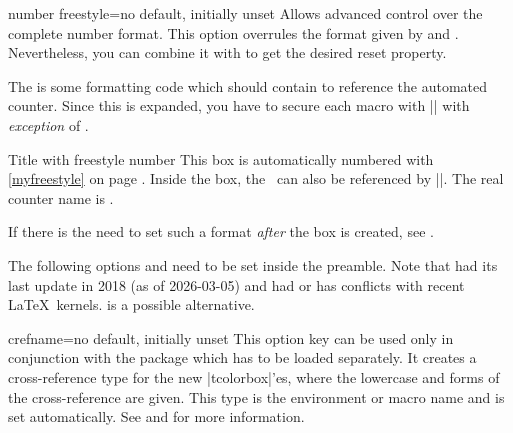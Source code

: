 \begin{newTcbKey}{number freestyle}{=}{no default, initially unset}
Allows advanced control over the complete number format. This option overrules
the format given by  and .
Nevertheless, you can combine it with  to
get the desired reset property.\par
The  is some formatting code which should contain  to
reference the automated counter. Since this  is expanded, you have
to secure each macro with |\noexpand| with \emph{exception} of .


\begin{dispExample}
\begin{phbox}[label={myfreestyle}]{Title with freestyle number}
This box is automatically numbered with \ref{myfreestyle} on page
\pageref{myfreestyle}. Inside the box, the \thetcbcounter\ can
also be referenced by |\thetcbcounter|.
The real counter name is \texttt{\tcbcounter}.
\end{phbox}
\end{dispExample}

If there is the need to set such a format \emph{after} the box is created,
see .
\end{newTcbKey}

\clearpage
\begin{marker}
The following options  and 
need to be set inside the preamble.
Note that  had its last update in 2018 (as of 2026-03-05) and
had or has conflicts with recent \LaTeX\ kernels.  is
a possible alternative.
\end{marker}

\begin{newTcbKey}[][doc updated=2014-12-01]{crefname}{=}{no default, initially unset}
  This option key can be used only in conjunction with the  package
  \cite{cubitt:2018a} which has to be loaded separately.
  It creates a cross-reference type for the new |tcolorbox|'es, where the
  lowercase  and  forms of the cross-reference are given.
  This type is the environment or macro name and  is set automatically.
  See  and \cite{cubitt:2018a} for more information.
\end{newTcbKey}


